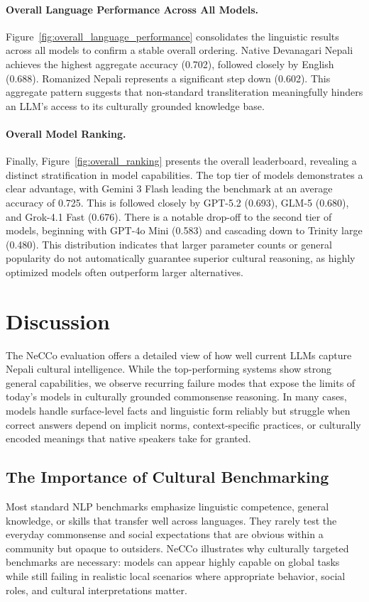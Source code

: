 \documentclass[10pt, a4paper]{article}
\begin{document}
\paragraph{Overall Language Performance Across All Models. }
Figure~\ref{fig:overall_language_performance} consolidates the linguistic results across all models to confirm a stable overall ordering. Native Devanagari Nepali achieves the highest aggregate accuracy (0.702), followed closely by English (0.688). Romanized Nepali represents a significant step down (0.602). This aggregate pattern suggests that non-standard transliteration meaningfully hinders an LLM's access to its culturally grounded knowledge base.

\paragraph{Overall Model Ranking.}
Finally, Figure~\ref{fig:overall_ranking} presents the overall leaderboard, revealing a distinct stratification in model capabilities. The top tier of models demonstrates a clear advantage, with Gemini 3 Flash leading the benchmark at an average accuracy of 0.725. This is followed closely by GPT-5.2 (0.693), GLM-5 (0.680), and Grok-4.1 Fast (0.676). There is a notable drop-off to the second tier of models, beginning with GPT-4o Mini (0.583) and cascading down to Trinity large (0.480). This distribution indicates that larger parameter counts or general popularity do not automatically guarantee superior cultural reasoning, as highly optimized models often outperform larger alternatives.

\section{Discussion}
The NeCCo evaluation offers a detailed view of how well current LLMs capture Nepali cultural intelligence. While the top-performing systems show strong general capabilities, we observe recurring failure modes that expose the limits of today's models in culturally grounded commonsense reasoning. In many cases, models handle surface-level facts and linguistic form reliably but struggle when correct answers depend on implicit norms, context-specific practices, or culturally encoded meanings that native speakers take for granted.

\subsection{The Importance of Cultural Benchmarking}
Most standard NLP benchmarks emphasize linguistic competence, general knowledge, or skills that transfer well across languages. They rarely test the everyday commonsense and social expectations that are obvious within a community but opaque to outsiders. NeCCo illustrates why culturally targeted benchmarks are necessary: models can appear highly capable on global tasks while still failing in realistic local scenarios where appropriate behavior, social roles, and cultural interpretations matter.
\end{document}
